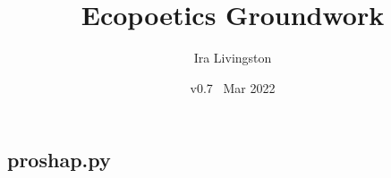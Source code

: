 \documentclass[draft]{article}
\title{Ecopoetics Groundwork}
\author{Ira Livingston}
\date{v0.7 \ Mar 2022}
\begin{document}
\maketitle
\subsection{proshap.py}
\gdef\bassshape{%
{36.8512}%
{-0.519031}b{36.8512}\\%
{-0.259516}t{33.391}{6.92042}\\%
{0.432526}t{30.1038}{13.4948}\\%
{1.55709}t{26.8166}{20.0692}\\%
{3.11419}t{23.7889}{26.1246}\\%
{5.10381}t{21.0208}{31.6609}\\%
{7.43945}t{18.5121}{36.6782}\\%
{10.1211}t{16.3495}{41.0035}\\%
{11.5917}t{15.4412}{11.2024}st{26.6436}{20.5017}st{47.1453}{11.1159}\\%
{11.6782}t{15.3877}{10.6503}t{27.2491}{19.2907}t{47.7509}{10.5638}\\%
{11.7647}t{15.3343}{10.0117}t{27.9412}{17.9066}t{48.4429}{9.9252}\\%
{12.0242}t{15.174}{9.56646}t{28.5467}{16.6955}t{49.0484}{9.47995}\\%
{12.2837}t{15.0137}{9.12121}t{29.1522}{15.4844}t{49.654}{9.0347}\\%
{12.6298}t{14.8}{8.8159}t{29.6713}{14.4464}t{50.173}{8.72939}\\%
{13.0623}t{14.5329}{8.72261}t{30.0317}{13.7255}t{50.5334}{8.6361}\\%
{13.1488}t{14.4968}{8.68656}t{30.1038}{13.5813}t{50.6055}{8.60006}\\%
{13.5813}t{14.3166}{8.43426}t{30.5363}{12.7163}t{51.0381}{8.34775}\\%
{14.1869}t{14.0643}{8.34054}t{30.8824}{12.0242}t{51.3841}{8.25404}\\%
{14.7924}t{13.812}{8.33333}t{31.1419}{11.5052}t{51.6436}{8.24683}\\%
{15.3979}t{13.5597}{8.41263}t{31.3149}{11.1592}t{51.8166}{8.32612}\\%
{16.0035}t{13.3074}{8.57843}t{31.4014}{10.9862}t{51.9031}{8.49193}\\%
{16.1765}t{13.2353}{8.65052}t{31.4014}{10.9862}t{51.9031}{8.56401}\\%
{16.6955}t{13.085}{8.80077}t{31.4014}{10.9862}t{51.9031}{8.71426}\\%
{17.301}t{12.9098}{9.06256}t{31.3149}{11.1592}t{51.8166}{8.97605}\\%
}
\end{document}
